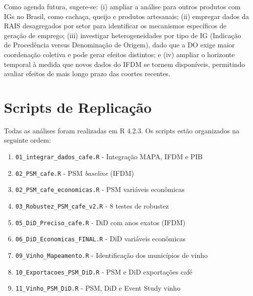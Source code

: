 \documentclass[12pt, a4paper]{article}
\begin{document}
Como agenda futura, sugere-se: (i) ampliar a análise para outros produtos com IGs no Brasil, como cachaça, queijo e produtos artesanais; (ii) empregar dados da RAIS desagregados por setor para identificar os mecanismos específicos de geração de emprego; (iii) investigar heterogeneidades por tipo de IG (Indicação de Procedência versus Denominação de Origem), dado que a DO exige maior coordenação coletiva e pode gerar efeitos distintos; e (iv) ampliar o horizonte temporal à medida que novos dados do IFDM se tornem disponíveis, permitindo avaliar efeitos de mais longo prazo das coortes recentes.



\appendix
\section{Scripts de Replicação}

Todas as análises foram realizadas em R 4.2.3. Os scripts estão organizados na seguinte ordem:

\begin{enumerate}
  \item \texttt{01\_integrar\_dados\_cafe.R} - Integração MAPA, IFDM e PIB
  \item \texttt{02\_PSM\_cafe.R} - PSM \textit{baseline} (IFDM)
  \item \texttt{02\_PSM\_cafe\_economicas.R} - PSM variáveis econômicas
  \item \texttt{03\_Robustez\_PSM\_cafe\_v2.R} - 8 testes de robustez
  \item \texttt{05\_DiD\_Preciso\_cafe.R} - DiD com anos exatos (IFDM)
  \item \texttt{06\_DiD\_Economicas\_FINAL.R} - DiD variáveis econômicas
  \item \texttt{09\_Vinho\_Mapeamento.R} - Identificação dos municípios de vinho
  \item \texttt{10\_Exportacoes\_PSM\_DiD.R} - PSM e DiD exportações café
  \item \texttt{11\_Vinho\_PSM\_DiD.R} - PSM, DiD e Event Study vinho
\end{enumerate}
\end{document}

